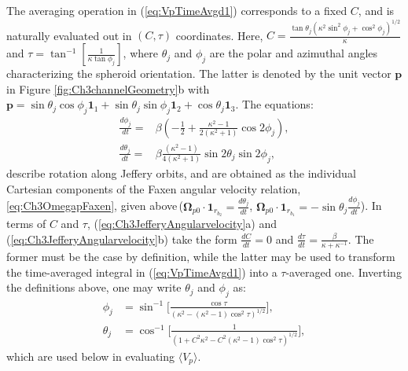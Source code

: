 \documentclass{jfm}
\begin{document}
The averaging operation in (\ref{eq:VpTimeAvgd1}) corresponds to a fixed $C$, and is naturally evaluated out in $(C,\tau)$ coordinates\citep{leal1971,navaneeth2016}. Here, $C=\frac{\tan\theta_j(\kappa^2\sin^2\phi_j+\cos^2\phi_j)^{1/2}}{\kappa}$ and $\tau=\tan^{-1}\left[\frac{1}{\kappa\tan\phi_j}\right]$, where $\theta_j$ and  $\phi_j$ are the polar and azimuthal angles characterizing the spheroid orientation. The latter is denoted by the unit vector $\bm{p}$ in Figure \ref{fig:Ch3channelGeometry}b with $\bm{p}=\sin\theta_j\cos\phi_j\bm{1}_1+\sin\theta_j\sin\phi_j\bm{1}_2+\cos\theta_j\bm{1}_3$. The equations:
\begin{subequations}
\begin{align}
\frac{d\phi_j}{dt} =&\beta \left(-\frac{1}{2}+\frac{\kappa^2-1}{2 (\kappa^2+1)}\cos 2\phi_j\right),\\
\frac{d\theta_j}{dt} =&\beta\frac{(\kappa^2-1)}{4(\kappa^2+1)}\sin 2\theta_j\sin 2\phi_j,
\end{align}
\label{eq:Ch3JefferyAngularvelocity}
\end{subequations}
describe rotation along Jeffery orbits, and are obtained as the individual Cartesian components of the Faxen angular velocity relation, \eqref{eq:Ch3OmegapFaxen}, given above\,($\bm{\Omega}_{p0} \cdot \bm{1}_{r_{b_2}} = \frac{d\theta_j}{dt}$, $\bm{\Omega}_{p0} \cdot \bm{1}_{r_{b_1}} = -\sin \theta_j\frac{d\phi_j}{dt}$). In terms of $C$ and $\tau$, (\ref{eq:Ch3JefferyAngularvelocity}a) and (\ref{eq:Ch3JefferyAngularvelocity}b) take the form $\frac{dC}{dt}=0$ and $\frac{d\tau}{dt}=\frac{\beta}{\kappa+\kappa^{-1}}$. The former must be the case by definition, while the latter may be used to transform the time-averaged integral in (\ref{eq:VpTimeAvgd1}) into a $\tau$-averaged one. Inverting the definitions above, one may write $\theta_j$ and $\phi_j$ as:
\begin{subequations}
\begin{align}
\phi_j&=\sin^{-1}\Big[\frac{\cos\tau}{(\kappa^2-(\kappa^2-1) \cos^2\tau)^{1/2}}\Big],\\
\theta_j&=\cos^{-1}\Big[\frac{1}{(1+C^2\kappa^2-C^2(\kappa^2-1)\cos^2\tau)^{1/2}}\Big],
\end{align}  \label{eq:Ch3Spheroidangles}
\end{subequations}
which are used below in evaluating $\langle V_p \rangle$.
\end{document}
